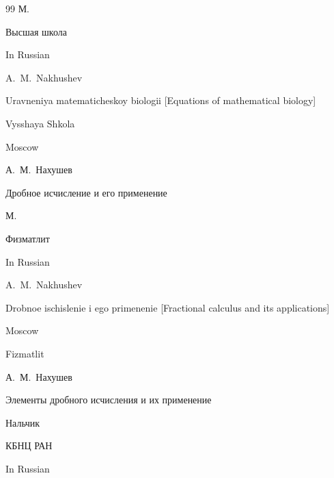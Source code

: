 \begin{thebibliography}{99}
\publaddr М.

\publ Высшая школа




\misctransl

\lang In Russian

\by A.~M.~Nakhushev

\book Uravneniya matematicheskoy biologii \rm [Equations of mathematical biology]

\publ Vysshaya Shkola

\publaddr Moscow








\by А.~М.~Нахушев

\book Дробное исчисление и его применение

\publaddr М.

\publ Физматлит




\misctransl

\lang In Russian

\by A.~M.~Nakhushev

\book Drobnoe ischislenie i ego primenenie \rm [Fractional calculus and its applications]

\publaddr Moscow

\publ Fizmatlit










\by А.~М.~Нахушев

\book Элементы дробного исчисления и их применение

\publaddr Нальчик

\publ КБНЦ РАН



\misctransl

\lang In Russian


\end{thebibliography}
